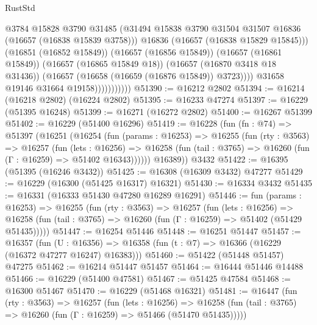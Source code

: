 \begin{lexlean}{RustStd}
\begin{coremodule}
                                @3784
                                @15828
                                @3790
                                @31485
                                (@31494
                                  @15838
                                  @3790
                                  @31504
                                  @31507
                                  @16836
                                  (@16657 (@16838 @15839 @3758)))
                                @16836
                                (@16657 (@16838 @15829 @15845)))
                              (@16851 (@16852 @15849))
                              (@16657 (@16856 @15849))
                              (@16657 (@16861 @15849))
                              (@16657 (@16865 @15849 @18))
                              (@16657 (@16870 @3418 @18 @31436))
                              (@16657 (@16658 (@16659 (@16876 @15849)) @3723))))
                          @31658
                          @19146
                          @31664
                          @19158)))))))))))
@51390 := @16212 @2802
@51394 := @16214 (@16218 @2802) (@16224 @2802)
@51395 := @16233 @47274
@51397 := @16229 (@51395 @16248)
@51399 := @16271 (@16272 @2802)
@51400 := @16267 @51399
@51402 := @16229 (@51400 @16296)
@51419 := @16228
    (fun (fn : @74) =>
    @51397
      (@16251
        (@16254
          (fun (params : @16253) =>
          @16255
            (fun (rty : @3563) =>
            @16257
              (fun (lets : @16256) =>
              @16258 (fun (tail : @3765) => @16260 (fun (Γ : @16259) => @51402 @16343))))))
        @16389))
    @3432
@51422 := @16395 (@51395 (@16246 @3432))
@51425 := @16308 (@16309 @3432) @47277
@51429 := @16229 (@16300 (@51425 @16317) @16321)
@51430 := @16334 @3432
@51435 := @16331 (@16333 @51430 @47280 @16289 @16291)
@51446 := fun (params : @16253) =>
  @16255
    (fun (rty : @3563) =>
    @16257
      (fun (lets : @16256) =>
      @16258 (fun (tail : @3765) => @16260 (fun (Γ : @16259) => @51402 (@51429 @51435)))))
@51447 := @16254 @51446
@51448 := @16251 @51447
@51457 := @16357
    (fun (U : @16356) => @16358 (fun (t : @7) => @16366 (@16229 (@16372 @47277 @16247) @16383)))
@51460 := @51422 (@51448 @51457) @47275
@51462 := @16214 @51447 @51457
@51464 := @16444 @51446 @14488
@51466 := @16229 (@51400 @47581)
@51467 := @51425 @47584
@51468 := @16300 @51467
@51470 := @16229 (@51468 @16321)
@51481 := @16447
    (fun (rty : @3563) =>
    @16257
      (fun (lets : @16256) =>
      @16258 (fun (tail : @3765) => @16260 (fun (Γ : @16259) => @51466 (@51470 @51435)))))

\end{coremodule}
\end{lexlean}
